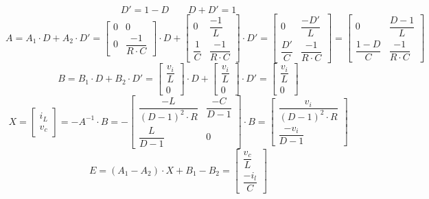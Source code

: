 \documentclass[a4paper,11pt,fleqn]{article}
\begin{document}
\[ D' = 1 - D \qquad D + D' = 1 \]
\[ A = A_1 \cdot D + A_2 \cdot D'
     = \left[\begin{array}{cc}
            0 & 0 \\
            0 & \dfrac{-1}{R \cdot C}
        \end{array}\right]
     \cdot D
     + \left[\begin{array}{cc}
            0 & \dfrac{-1}{L} \\
            \dfrac{1}{C} & \dfrac{-1}{R \cdot C}
        \end{array}\right]
     \cdot D'
     = \left[\begin{array}{cc}
            0 & \dfrac{-D'}{L} \\
            \dfrac{D'}{C} & \dfrac{-1}{R \cdot C}
        \end{array}\right]
     = \left[\begin{array}{cc}
            0 & \dfrac{D-1}{L} \\
            \dfrac{1-D}{C} & \dfrac{-1}{R \cdot C}
        \end{array}\right]
\]
\[ B = B_1 \cdot D + B_2 \cdot D'
     = \left[\begin{array}{c}
            \dfrac{v_i}{L} \\
            0
        \end{array}\right]
     \cdot D 
     + \left[\begin{array}{c}
            \dfrac{v_i}{L} \\
            0
        \end{array}\right]
     \cdot D'
     = \left[\begin{array}{c}
            \dfrac{v_i}{L} \\
            0
        \end{array}\right]
\]
\[ X = \left[\begin{array}{c}i_L\\v_c\end{array}\right] = -A^{-1} \cdot B 
     = -\left[\begin{array}{cc}
            \dfrac{-L}{(D - 1)^2 \cdot R} & \dfrac{-C}{D - 1} \\
            \dfrac{L}{D-1} & 0
        \end{array}\right] \cdot B
     = \left[\begin{array}{c}
            \dfrac{v_i}{(D - 1)^2 \cdot R} \\
            \dfrac{-v_i}{D-1}
        \end{array}\right]
\]
\[ E = (A_1 - A_2) \cdot X + B_1 - B_2
     = \left[\begin{array}{c}
            \dfrac{v_c}{L} \\
            \dfrac{-i_l}{C}
        \end{array}\right]
\]
\end{document}
